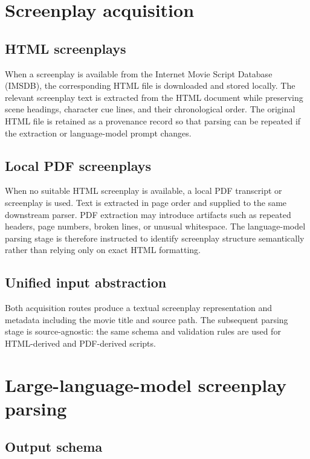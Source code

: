 \documentclass[11pt]{article}
\begin{document}
\section{Screenplay acquisition}

\subsection{HTML screenplays}

When a screenplay is available from the Internet Movie Script Database (IMSDB), the corresponding HTML file is downloaded and stored locally. The relevant screenplay text is extracted from the HTML document while preserving scene headings, character cue lines, and their chronological order. The original HTML file is retained as a provenance record so that parsing can be repeated if the extraction or language-model prompt changes.

\subsection{Local PDF screenplays}

When no suitable HTML screenplay is available, a local PDF transcript or screenplay is used. Text is extracted in page order and supplied to the same downstream parser. PDF extraction may introduce artifacts such as repeated headers, page numbers, broken lines, or unusual whitespace. The language-model parsing stage is therefore instructed to identify screenplay structure semantically rather than relying only on exact HTML formatting.

\subsection{Unified input abstraction}

Both acquisition routes produce a textual screenplay representation and metadata including the movie title and source path. The subsequent parsing stage is source-agnostic: the same schema and validation rules are used for HTML-derived and PDF-derived scripts.

\section{Large-language-model screenplay parsing}

\subsection{Output schema}
\end{document}
